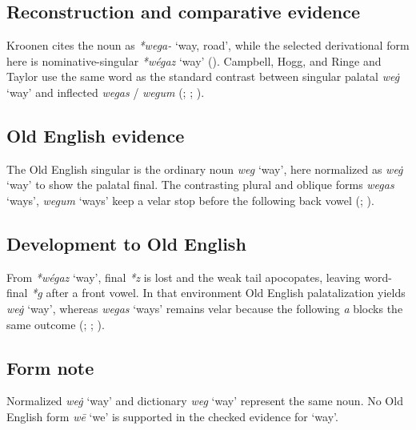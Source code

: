 \documentclass[
  british,
  a4paper,
  openany]{book}
\providecommand{\Recon}[1]{\emph{*#1}}
{\catcode`→=\active \global\def→{\ensuremath{\rightarrow}}}
\providecommand{\Recon}[1]{\emph{*#1}}
{\catcode`→=\active \global\def→{\ensuremath{\rightarrow}}}
\begin{document}
\subsection{Reconstruction and comparative
evidence}\label{reconstruction-and-comparative-evidence-64}

Kroonen cites the noun as \emph{*wega-} `way, road', while the selected
derivational form here is nominative-singular \Recon{wégaz} `way'
(). Campbell, Hogg, and Ringe
and Taylor use the same word as the standard contrast between singular
palatal \emph{weġ} `way' and inflected \emph{wegas} / \emph{wegum}
(;
; ).

\subsection{Old English evidence}\label{old-english-evidence-64}

The Old English singular is the ordinary noun \emph{weg} `way', here
normalized as \emph{weġ} `way' to show the palatal final. The
contrasting plural and oblique forms \emph{wegas} `ways', \emph{wegum}
`ways' keep a velar stop before the following back vowel
(;
).

\subsection{Development to Old
English}\label{development-to-old-english-64}

From \Recon{wégaz} `way', final \emph{*z} is lost and the weak tail
apocopates, leaving word-final \emph{*g} after a front vowel. In that
environment Old English palatalization yields \emph{weġ} `way', whereas
\emph{wegas} `ways' remains velar because the following \emph{a} blocks
the same outcome (;
; ).

\subsection{Form note}\label{form-note-25}

Normalized \emph{weġ} `way' and dictionary \emph{weg} `way' represent
the same noun. No Old English form \emph{wē} `we' is supported in the
checked evidence for `way'.
\end{document}
